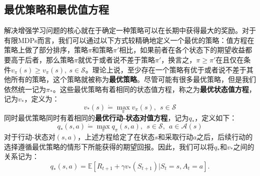 \documentclass{ctexart}
\begin{document}
        \subsection{最优策略和最优值方程}
            解决增强学习问题的核心就在于确定一种策略可以在长期中获得最大的奖励。对于有限MDPs而言，我们可以通过以下方式较精确地定义一个最优的策略：值方程在策略上做了部分排序，策略$\pi$和策略$\pi '$相比，如果前者在各个状态下的期望收益都要高于后者，那么策略$\pi$就优于或者说不差于策略$\pi '$，换言之，$\pi \ge \pi '$在且仅在条件$v_{\pi}(s) \ge v_{\pi}(s),\ s \in \mathcal{S}$。理论上说，至少存在一个策略有优于或者说不差于其他所有的策略，这个策略就被称为\textbf{最优策略}。尽管可能有很多最优策略，但是我们依然统一记为$\pi_*$。这些最优策略有着相同的状态值方程，称之为\textbf{最优状态值方程}，记为$v_*$，定义为：
            \begin{equation}
                v_*(s) \dot{=} \operatorname*{max}\limits_{\pi} v_{\pi}(s),\ \ s\in \mathcal{S}
                \label{e3.15}
            \end{equation}
            同时最优策略同时有着相同的\textbf{最优行动-状态对值方程}，记为$q_*$，定义如下：
            \begin{equation}
                q_*(s,a) \dot{=} \operatorname*{max}\limits_{\pi} q_{\pi}(s,a),\ \ s\in \mathcal{S},\ \ a \in \mathcal{A}(s)
                \label{e3.16}
            \end{equation}
            对于行动-状态对$(s,a)$，上述方程给定了在状态$s$和采取行动$a$之后，后续行动的选择遵循最优策略的情形下所能获得的期望回报。因此，我们可以将$q_*$和$v_*$之间的关系记为：
            \begin{equation}
                q_*(s,a) = \mathbb{E}[R_{t+1} + \gamma v_*(S_{t+1})|S_t=s,A_t=a].
                \label{e3.17}
            \end{equation}
\end{document}
